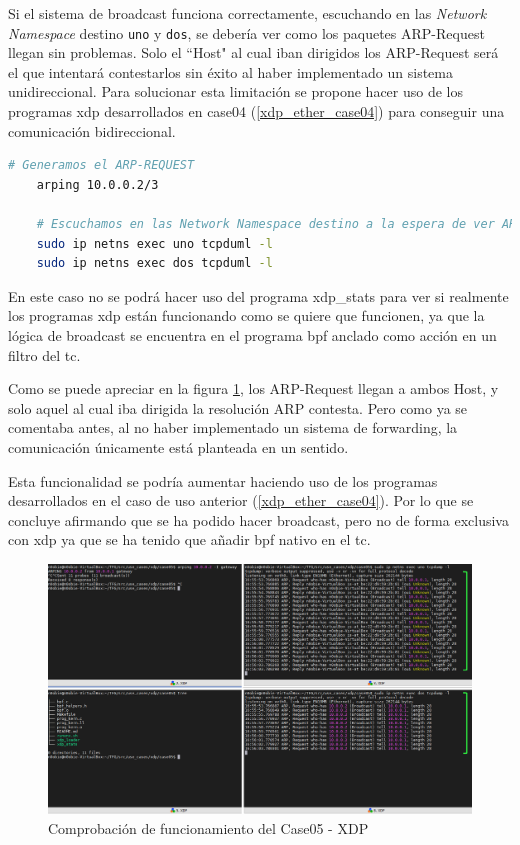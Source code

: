 Si el sistema de broadcast funciona correctamente, escuchando en las \textit{Network Namespace} destino \texttt{uno} y \texttt{dos}, se debería ver como los paquetes ARP-Request llegan sin problemas. Solo el ``Host" al cual iban dirigidos los ARP-Request será el que intentará contestarlos sin éxito al haber implementado un sistema unidireccional. Para solucionar esta limitación se propone hacer uso de los programas \gls{xdp} desarrollados en case04 (\ref{xdp_ether_case04}) para conseguir una comunicación bidireccional.\\
\par
\begin{lstlisting}[language= bash, style=Consola, caption={Comprobación del funcionamiento - Case05},label=code:case05_xdp_ether_func]
    # Generamos el ARP-REQUEST
    arping 10.0.0.2/3
    
    # Escuchamos en las Network Namespace destino a la espera de ver ARP-REQUEST.
    sudo ip netns exec uno tcpduml -l
    sudo ip netns exec dos tcpduml -l
\end{lstlisting}
\vspace{0.5cm}

En este caso no se podrá hacer uso del programa xdp\_stats para ver si realmente los programas \gls{xdp} están funcionando como se quiere que funcionen, ya que la lógica de broadcast se encuentra en el programa \gls{bpf} anclado como acción en un filtro del \gls{tc}.\\
\par
Como se puede apreciar en la figura \ref{fig:case05_xdp_ether_func}, los ARP-Request \hspace{1mm} llegan a ambos Host, y solo aquel al cual iba dirigida la resolución ARP contesta. Pero como ya se comentaba antes, al no haber implementado un sistema de forwarding, la comunicación únicamente está planteada en un sentido.\\
\par
Esta funcionalidad se podría aumentar haciendo uso de los programas desarrollados en el caso de uso anterior (\ref{xdp_ether_case04}). Por lo que se concluye afirmando que se ha podido hacer broadcast, pero no de forma exclusiva con \gls{xdp} ya que se ha tenido que añadir \gls{bpf} nativo en el \gls{tc}.

\begin{figure}[ht]
    \centering
    \includegraphics[width=16cm]{archivos/img/dev/xdp/case05/demo_case05_edited.png}
    \caption{Comprobación de funcionamiento del Case05 - XDP}
    \label{fig:case05_xdp_ether_func}
\end{figure}
\newpage

